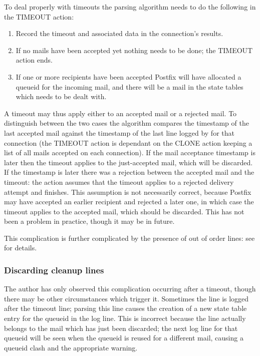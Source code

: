 To deal properly with timeouts the parsing algorithm needs to do the
following in the TIMEOUT action:

\begin{enumerate}

    \item Record the timeout and associated data in the connection's
        results.

    \item If no mails have been accepted yet nothing needs to be done; the
        TIMEOUT action ends.  

    \item If one or more recipients have been accepted Postfix will have
        allocated a queueid for the incoming mail, and there will be a mail
        in the state tables which needs to be dealt with.

\end{enumerate}

A timeout may thus apply either to an accepted mail or a rejected mail.  To
distinguish between the two cases the algorithm compares the timestamp of
the last accepted mail against the timestamp of the last line logged by
 for that connection (the TIMEOUT action is dependant on the
CLONE action keeping a list of all mails accepted on each connection).  If
the mail acceptance timestamp is later then the timeout applies to the
just-accepted mail, which will be discarded.  If the 
timestamp is later there was a rejection between the accepted mail and the
timeout: the action assumes that the timeout applies to a rejected delivery
attempt and finishes.  This assumption is not necessarily correct, because
Postfix may have accepted an earlier recipient and rejected a later one, in
which case the timeout applies to the accepted mail, which should be
discarded.  This has not been a problem in practice, though it may be in
future.

This complication is further complicated by the presence of out of order
 lines: see  for
details.

\subsubsection{Discarding cleanup lines}

\label{discarding cleanup lines}

The author has only observed this complication occurring after a timeout,
though there may be other circumstances which trigger it.  Sometimes the
 line is logged after the timeout line; parsing this line
causes the creation of a new state table entry for the queueid in the log
line.  This is incorrect because the line actually belongs to the mail
which has just been discarded; the next log line for that queueid will be
seen when the queueid is reused for a different mail, causing a queueid
clash and the appropriate warning.


